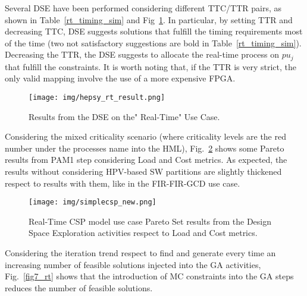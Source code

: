 %
Several DSE have been performed considering different TTC/TTR pairs, as shown in Table~\ref{rt_timing_sim} and Fig~\ref{results_rt_exaple}. In particular, by setting TTR and decreasing TTC, DSE suggests solutions that fulfill the timing requirements most of the time (two not satisfactory suggestions are bold in Table~\ref{rt_timing_sim}). Decreasing the TTR, the DSE suggests to allocate the real-time process on $pu_j$ that fulfill the constraints. It is worth noting that, if the TTR is very strict, the only valid mapping involve the use of a more expensive FPGA. \par
%
\begin{figure}[htbp]
	\centerline{\texttt{[image: img/hepsy\_rt\_result.png]}}
	\caption{Results from the DSE on the" Real-Time" Use Case.}
	\label{results_rt_exaple}
\end{figure}
%
Considering the mixed criticality scenario (where criticality levels are the red number under the processes name into the HML), Fig.~\ref{fig8_a_rt} shows some Pareto results from PAM1 step considering Load and Cost metrics. As expected, the results without considering HPV-based SW partitions are slightly thickened respect to results with them, like in the FIR-FIR-GCD use case.  \par
%
\begin{figure}[htbp]
	\centerline{\texttt{[image: img/simplecsp\_new.png]}}
	\caption{Real-Time CSP model use case Pareto Set results from the Design Space Exploration activities respect to Load and Cost metrics.}
	\label{fig8_a_rt}
\end{figure}
%
Considering the iteration trend respect to find and generate every time an increasing number of feasible solutions injected into the GA activities, Fig.~\ref{fig7_rt} shows that the introduction of MC constraints into the GA steps reduces the number of feasible solutions. \par
%
\begin{figure*}[htbp]
    \centering
    \label{7a_rt} \hfill 
    \label{7d_rt} \\
  \caption{Design space exploration trend considering each iteration and the percentage of feasible solutions found during each step of the genetic algorithm.}
  \label{fig7_rt} 
\end{figure*}
